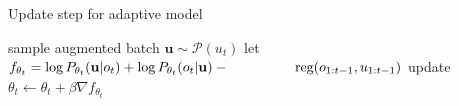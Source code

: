 \documentclass[11pt,a4paper]{article}
\begin{document}
\begin{algorithm}[t!]
	\caption{Update step for adaptive model}
    \label{alg:listener_update}
\begin{algorithmic}[1]
        \STATE sample augmented batch $\mathbf{u} \sim \mathcal{P}(u_t)$\;
        \STATE let $f_{\theta_t} =  \log P_{\theta_t}(\mathbf{u} | o_t)  + \log P_{\theta_t}(o_t | \mathbf{u}) - \text{\hspace{1.65cm}}\text{reg}(o_{1:t-1},u_{1:t-1})$
        \STATE update $\theta_{t} \leftarrow \theta_t + \beta\nabla f_{\theta_t}$
   \ENDFOR
\end{algorithmic}
\end{algorithm}
\end{document}
